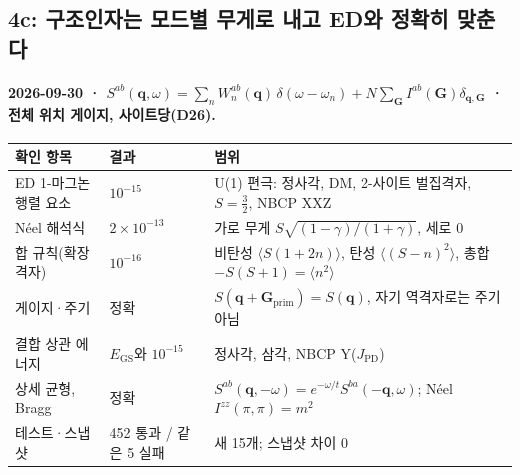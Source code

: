 \subsection{4c: 구조인자는 모드별 무게로 내고 ED와 정확히 맞춘다}\label{stage4c-structure-factor}
\begingroup%
  \framesubtitle{2026-09-30 · $S^{ab}(\mathbf q,\omega)=\sum_nW_n^{ab}(\mathbf q)\,\delta(\omega-\omega_n)+N\sum_{\mathbf G}I^{ab}(\mathbf G)\delta_{\mathbf q,\mathbf G}$ · 전체 위치 게이지, 사이트당(D26).}
  \footnotesize\renewcommand{\arraystretch}{1.08}
  \begin{tabularx}{\textwidth}{@{}P{3.3cm}P{3.2cm}Y@{}}
    \toprule
    확인 항목 & 결과 & 범위 \\
    \midrule
    ED 1-마그논 행렬 요소 & $10^{-15}$ & U(1) 편극: 정사각, DM, 2-사이트 벌집격자, $S=\tfrac32$, NBCP XXZ \\
    Néel 해석식 & $2\times10^{-13}$ & 가로 무게 $S\sqrt{(1-\gamma)/(1+\gamma)}$, 세로 0 \\
    합 규칙(확장 격자) & $10^{-16}$ & 비탄성 $\langle S(1+2n)\rangle$, 탄성 $\langle(S-n)^2\rangle$, 총합 $-S(S+1)=\langle n^2\rangle$ \\
    게이지·주기 & 정확 & $S(\mathbf q+\mathbf G_{\mathrm{prim}})=S(\mathbf q)$, 자기 역격자로는 주기 아님 \\
    결합 상관 에너지 & $E_{\mathrm{GS}}$와 $10^{-15}$ & 정사각, 삼각, NBCP Y($J_{\mathrm{PD}}$) \\
    상세 균형, Bragg & 정확 & $S^{ab}(\mathbf q,-\omega)=e^{-\omega/t}S^{ba}(-\mathbf q,\omega)$; Néel $I^{zz}(\pi,\pi)=m^2$ \\
    테스트·스냅샷 & 452 통과 / 같은 5 실패 & 새 15개; 스냅샷 차이 0 \\
    \bottomrule
  \end{tabularx}
  \par\medskip
\endgroup


